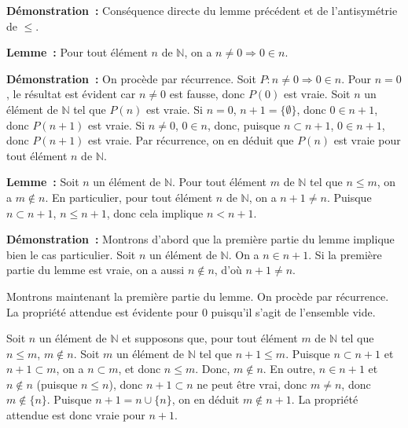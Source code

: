 \medskip

\noindent\textbf{Démonstration :} Conséquence directe du lemme précédent et de l'antisymétrie de $\leq$. 

   \done 

\medskip

\noindent\textbf{Lemme :} Pour tout élément $n$ de $\mathbb{N}$, on a $n \neq 0 \Rightarrow 0 \in n$.

\medskip

\noindent\textbf{Démonstration :} 
    On procède par récurrence. 
    Soit $P: n \neq 0 \Rightarrow 0 \in n$.
    Pour $n = 0$, le résultat est évident car $n \neq 0$ est fausse, donc $P(0)$ est vraie. 
    Soit $n$ un élément de $\mathbb{N}$ tel que $P(n)$ est vraie. 
    Si $n = 0$, $n+1 = \lbrace \emptyset \rbrace$, donc $0 \in n+1$, donc $P(n+1)$ est vraie.
    Si $n \neq 0$, $0 \in n$, donc, puisque $n \subset n+1$, $0 \in n+1$, donc $P(n+1)$ est vraie.
    Par récurrence, on en déduit que $P(n)$ est vraie pour tout élément $n$ de $\mathbb{N}$.

   \done 

\medskip

\noindent\textbf{Lemme :} 
    Soit $n$ un élément de $\mathbb{N}$. 
    Pour tout élément $m$ de $\mathbb{N}$ tel que $n \leq m$, on a $m \notin n$.
    En particulier, pour tout élément $n$ de $\mathbb{N}$, on a $n+1 \neq n$. 
    Puisque $n \subset n+1$, $n \leq n+1$, donc cela implique $n < n+1$. 

\medskip

\noindent\textbf{Démonstration :} 
    Montrons d'abord que la première partie du lemme implique bien le cas particulier. 
    Soit $n$ un élément de $\mathbb{N}$. 
    On a $n \in n+1$. 
    Si la première partie du lemme est vraie, on a aussi $n \notin n$, d'où $n+1 \neq n$.

    Montrons maintenant la première partie du lemme. 
    On procède par récurrence. 
    La propriété attendue est évidente pour $0$ puisqu'il s'agit de l'ensemble vide. 

    Soit $n$ un élément de $\mathbb{N}$ et supposons que, pour tout élément $m$ de $\mathbb{N}$ tel que $n \leq m$, $m \notin n$. 
    Soit $m$ un élément de $\mathbb{N}$ tel que $n+1 \leq m$. 
    Puisque $n \subset n+1$ et $n+1 \subset m$, on a $n \subset m$, et donc $n \leq m$.
    Donc, $m \notin n$. 
    En outre, $n \in n+1$ et $n \notin n$ (puisque $n \leq n$), donc $n+1 \subset n$ ne peut être vrai, donc $m \neq n$, donc $m \notin \lbrace n \rbrace$. 
    Puisque $n+1 = n \cup \lbrace n \rbrace$, on en déduit $m \notin n+1$. 
    La propriété attendue est donc vraie pour $n+1$.

